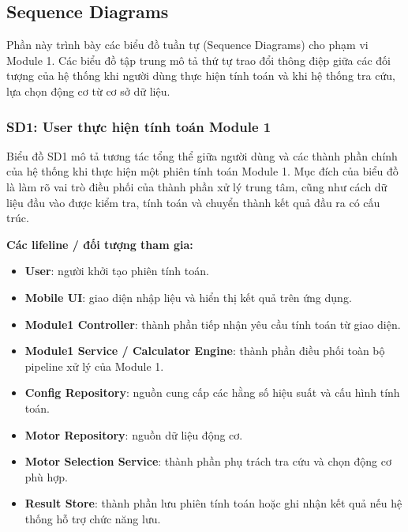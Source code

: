 \documentclass[a4paper]{article}
\begin{document}
\subsection{Sequence Diagrams}
Phần này trình bày các biểu đồ tuần tự (Sequence Diagrams) cho phạm vi Module 1. Các biểu đồ tập trung mô tả thứ tự trao đổi thông điệp giữa các đối tượng của hệ thống khi người dùng thực hiện tính toán và khi hệ thống tra cứu, lựa chọn động cơ từ cơ sở dữ liệu.

\subsubsection{SD1: User thực hiện tính toán Module 1}

Biểu đồ SD1 mô tả tương tác tổng thể giữa người dùng và các thành phần chính của hệ thống khi thực hiện một phiên tính toán Module 1. Mục đích của biểu đồ là làm rõ vai trò điều phối của thành phần xử lý trung tâm, cũng như cách dữ liệu đầu vào được kiểm tra, tính toán và chuyển thành kết quả đầu ra có cấu trúc.

\textbf{Các lifeline / đối tượng tham gia:}
\begin{itemize}
\item \textbf{User}: người khởi tạo phiên tính toán.
\item \textbf{Mobile UI}: giao diện nhập liệu và hiển thị kết quả trên ứng dụng.
\item \textbf{Module1 Controller}: thành phần tiếp nhận yêu cầu tính toán từ giao diện.
\item \textbf{Module1 Service / Calculator Engine}: thành phần điều phối toàn bộ pipeline xử lý của Module 1.
\item \textbf{Config Repository}: nguồn cung cấp các hằng số hiệu suất và cấu hình tính toán.
\item \textbf{Motor Repository}: nguồn dữ liệu động cơ.
\item \textbf{Motor Selection Service}: thành phần phụ trách tra cứu và chọn động cơ phù hợp.
\item \textbf{Result Store}: thành phần lưu phiên tính toán hoặc ghi nhận kết quả nếu hệ thống hỗ trợ chức năng lưu.
\end{itemize}
\end{document}

